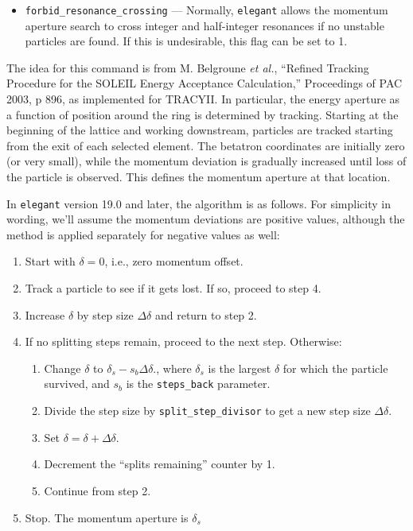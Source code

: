 \documentclass[11pt]{article}
\begin{document}
\begin{itemize}
\item \verb|forbid_resonance_crossing| --- Normally, {\tt elegant} allows the momentum
aperture search to cross integer and half-integer resonances if no unstable particles are
found.  If this is undesirable, this flag can be set to 1.
\end{itemize}

The idea for this command is from M. Belgroune {\em et al.}, ``Refined
Tracking Procedure for the SOLEIL Energy Acceptance Calculation,''
Proceedings of PAC 2003, p 896, as implemented for TRACYII.  In
particular, the energy aperture as a function of position around the
ring is determined by tracking.  Starting at the beginning of the
lattice and working downstream, particles are tracked starting from
the exit of each selected element.  The betatron coordinates are
initially zero (or very small), while the momentum deviation is
gradually increased until loss of the particle is observed.  This
defines the momentum aperture at that location.

In {\tt elegant} version 19.0 and later, the algorithm is as follows.  For simplicity in
wording, we'll assume the momentum deviations are positive values,
although the method is applied separately for negative values as well:
\begin{enumerate}
\item Start with $\delta=0$, i.e., zero momentum offset.
\item Track a particle to see if it gets lost.  If so, proceed to step 4.
\item Increase $\delta$ by step size $\Delta\delta$ and return to step 2.
\item If no splitting steps remain, proceed to the next step.  Otherwise:
\begin{enumerate}
\item Change $\delta$ to $\delta_s - s_b\Delta\delta$., where $\delta_s$ is
 the largest $\delta$ for which the particle survived, and $s_b$ is the
 \verb|steps_back| parameter.
\item Divide the step size by \verb|split_step_divisor| to get a new step size  $\Delta\delta$.
\item Set $\delta = \delta + \Delta\delta$.
\item Decrement the ``splits remaining'' counter by 1.
\item Continue from step 2.
\end{enumerate}
\item Stop.  The momentum aperture is $\delta_s$
\end{enumerate}
\end{document}
